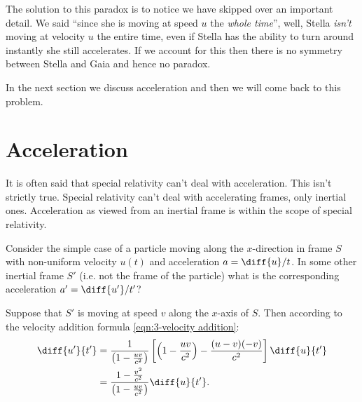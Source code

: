 \documentclass[fleqn]{NotesClass}
\begin{document}
    The solution to this paradox is to notice we have skipped over an important detail.
    We said \enquote{since she is moving at speed \(u\) the \emph{whole time}}, well, Stella \emph{isn't} moving at velocity \(u\) the entire time, even if Stella has the ability to turn around instantly she still accelerates.
    If we account for this then there is no symmetry between Stella and Gaia and hence no paradox.
    
    In the next section we discuss acceleration and then we will come back to this problem.
    
    \section{Acceleration}
    It is often said that special relativity can't deal with acceleration.
    This isn't strictly true.
    Special relativity can't deal with accelerating frames, only inertial ones.
    Acceleration as viewed from an inertial frame is within the scope of special relativity.
    
    Consider the simple case of a particle moving along the \(x\)-direction in frame \(S\) with non-uniform velocity \(u(t)\) and acceleration \(a = \diff{u}/{t}\).
    In some other inertial frame \(S'\) (i.e. not the frame of the particle) what is the corresponding acceleration \(a' = \diff{u'}/{t'}\)?
    
    Suppose that \(S'\) is moving at speed \(v\) along the \(x\)-axis of \(S\).
    Then according to the velocity addition formula \cref{eqn:3-velocity addition}:
    \begin{align}
        \diff{u'}{t'} &= \frac{1}{\left( 1 - \frac{uv}{c^2} \right)} \left[ \left( 1 - \frac{uv}{c^2} \right) - \frac{(u - v)(-v)}{c^2} \right] \diff{u}{t'}\\
        &= \frac{1 - \frac{v^2}{c^2}}{\left( 1 - \frac{uv}{c^2} \right)} \diff{u}{t'}.
    \end{align}
    
\end{document}
